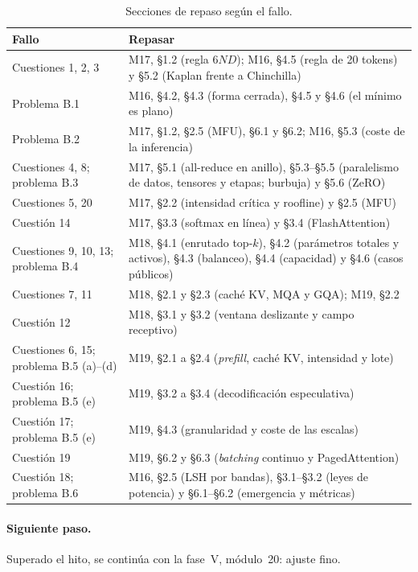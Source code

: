 \begin{table}[h]
\centering\small
\caption{Secciones de repaso según el fallo.}\label{tab:repaso}
\begin{tabularx}{\textwidth}{@{}>{\raggedright\arraybackslash}p{4.2cm}X@{}}
\toprule
Fallo & Repasar \\
\midrule
Cuestiones 1, 2, 3 & M17, §1.2 (regla $6ND$); M16, §4.5 (regla de 20 tokens) y §5.2 (Kaplan frente a Chinchilla) \\
Problema B.1 & M16, §4.2, §4.3 (forma cerrada), §4.5 y §4.6 (el mínimo es plano) \\
Problema B.2 & M17, §1.2, §2.5 (MFU), §6.1 y §6.2; M16, §5.3 (coste de la inferencia) \\
Cuestiones 4, 8; problema B.3 & M17, §5.1 (all-reduce en anillo), §5.3--§5.5 (paralelismo de datos, tensores y etapas; burbuja) y §5.6 (ZeRO) \\
Cuestiones 5, 20 & M17, §2.2 (intensidad crítica y roofline) y §2.5 (MFU) \\
Cuestión 14 & M17, §3.3 (softmax en línea) y §3.4 (FlashAttention) \\
Cuestiones 9, 10, 13; problema B.4 & M18, §4.1 (enrutado top-$k$), §4.2 (parámetros totales y activos), §4.3 (balanceo), §4.4 (capacidad) y §4.6 (casos públicos) \\
Cuestiones 7, 11 & M18, §2.1 y §2.3 (caché KV, MQA y GQA); M19, §2.2 \\
Cuestión 12 & M18, §3.1 y §3.2 (ventana deslizante y campo receptivo) \\
Cuestiones 6, 15; problema B.5 (a)--(d) & M19, §2.1 a §2.4 (\emph{prefill}, caché KV, intensidad y lote) \\
Cuestión 16; problema B.5 (e) & M19, §3.2 a §3.4 (decodificación especulativa) \\
Cuestión 17; problema B.5 (e) & M19, §4.3 (granularidad y coste de las escalas) \\
Cuestión 19 & M19, §6.2 y §6.3 (\emph{batching} continuo y PagedAttention) \\
Cuestión 18; problema B.6 & M16, §2.5 (LSH por bandas), §3.1--§3.2 (leyes de potencia) y §6.1--§6.2 (emergencia y métricas) \\
\bottomrule
\end{tabularx}
\end{table}

\paragraph{Siguiente paso.} Superado el hito, se continúa con la fase~V, módulo~20: ajuste fino.
